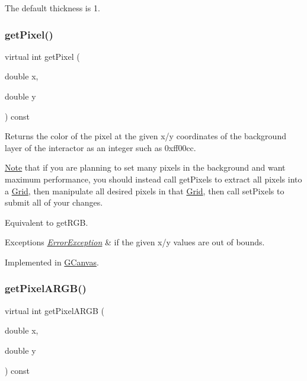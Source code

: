 The default thickness is 1. \mbox{\label{classGDrawingSurface_a40f3e3f64a8263e13b7162e15b2979ee}} 
\subsubsection{\texorpdfstring{get\+Pixel()}{getPixel()}}
{\footnotesize\ttfamily virtual int get\+Pixel (\begin{DoxyParamCaption}\item[{double}]{x,  }\item[{double}]{y }\end{DoxyParamCaption}) const\hspace{0.3cm}{\ttfamily [pure virtual]}}



Returns the color of the pixel at the given x/y coordinates of the background layer of the interactor as an integer such as 0xff00cc. 

\mbox{\hyperlink{classNote}{Note}} that if you are planning to set many pixels in the background and want maximum performance, you should instead call get\+Pixels to extract all pixels into a \mbox{\hyperlink{classGrid}{Grid}}, then manipulate all desired pixels in that \mbox{\hyperlink{classGrid}{Grid}}, then call set\+Pixels to submit all of your changes.

Equivalent to get\+R\+GB.


\begin{DoxyExceptions}{Exceptions}
{\em \mbox{\hyperlink{classErrorException}{Error\+Exception}}} & if the given x/y values are out of bounds. \\
\hline
\end{DoxyExceptions}


Implemented in \mbox{\hyperlink{classGCanvas_a076754305680c65782a00ddd3c77b50b}{G\+Canvas}}.

\mbox{\label{classGDrawingSurface_aee10de1ca7da1fc3f3fc0e48286f88f8}} 
\subsubsection{\texorpdfstring{get\+Pixel\+A\+R\+G\+B()}{getPixelARGB()}}
{\footnotesize\ttfamily virtual int get\+Pixel\+A\+R\+GB (\begin{DoxyParamCaption}\item[{double}]{x,  }\item[{double}]{y }\end{DoxyParamCaption}) const\hspace{0.3cm}{\ttfamily [pure virtual]}}



